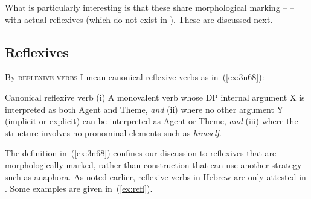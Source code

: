 \begin{exe}
\begin{xlist}
\begin{xlist}
\begin{exe}
\begin{xlist}
\begin{xlist}
\begin{exe}
\begin{xlist}
\begin{xlist}
\begin{exe}
\begin{exe}
\begin{xlist}
\begin{exe}
\begin{exe}
\begin{xlist}
\begin{exe}
\begin{exe}
\begin{exe}
\begin{exe}
\begin{exe}
\begin{xlist}
\begin{exe}
\begin{xlist}
\begin{exe}
\begin{exe}
\begin{xlist}
\begin{exe}
\begin{xlist}
\begin{exe}
\begin{xlist}
\begin{exe}
\begin{exe}
\begin{exe}
\begin{xlist}
\begin{exe}
\begin{exe}
\begin{exe}
\begin{xlist}
\begin{exe}
\begin{xlist}
\begin{exe}
\begin{exe}
\begin{xlist}
\begin{exe}
\begin{exe}
\begin{exe}
\begin{exe}
\begin{xlist}
\begin{exe}
\begin{xlist}
\begin{exe}
\begin{xlist}
\begin{exe}
\begin{xlist}
\begin{exe}
\begin{xlist}
\begin{exe}
\begin{xlist}
\begin{exe}
\begin{exe}
\begin{xlist}
\begin{exe}
\begin{xlist}
\begin{exe}
\begin{exe}
\begin{xlist}
\begin{exe}
\begin{xlist}
\begin{exe}
\begin{exe}
\begin{exe}
\begin{exe}
\begin{xlist}
\begin{xlist}
\begin{exe}
\begin{xlist}
\begin{exe}
\begin{exe}
\begin{exe}
\begin{xlist}
\begin{exe}
\begin{exe}
\begin{xlist}
What is particularly interesting is that these  share morphological marking -- \thit{} -- with actual reflexives (which do not exist in {\tnif}). These are discussed next.

	\subsection{Reflexives} \label{vz:thit:refl}
By \textsc{reflexive verbs} I mean canonical reflexive verbs as in~(\ref{ex:3n68}):

 \begin{exe}
\ex  \label{ex:3n68}Canonical reflexive verb
	(i) A monovalent verb whose DP internal argument X is interpreted as both Agent and Theme, \textit{and} (ii) where no other argument Y (implicit or explicit) can be interpreted as Agent or Theme, \textit{and} (iii) where the structure involves no pronominal elements such as \emph{himself}.
 \z 

The definition in~(\ref{ex:3n68}) confines our discussion to reflexives that are morphologically marked, rather than construction that can use another strategy such as anaphora. As noted earlier, reflexive verbs in Hebrew are only attested in \thit. Some examples are given in~(\ref{ex:refl}).


\end{exe}
\end{xlist}
\end{exe}
\end{exe}
\end{xlist}
\end{exe}
\end{exe}
\end{exe}
\end{xlist}
\end{exe}
\end{xlist}
\end{xlist}
\end{exe}
\end{exe}
\end{exe}
\end{exe}
\end{xlist}
\end{exe}
\end{xlist}
\end{exe}
\end{exe}
\end{xlist}
\end{exe}
\end{xlist}
\end{exe}
\end{exe}
\end{xlist}
\end{exe}
\end{xlist}
\end{exe}
\end{xlist}
\end{exe}
\end{xlist}
\end{exe}
\end{xlist}
\end{exe}
\end{xlist}
\end{exe}
\end{exe}
\end{exe}
\end{exe}
\end{xlist}
\end{exe}
\end{exe}
\end{xlist}
\end{exe}
\end{xlist}
\end{exe}
\end{exe}
\end{exe}
\end{xlist}
\end{exe}
\end{exe}
\end{exe}
\end{xlist}
\end{exe}
\end{xlist}
\end{exe}
\end{xlist}
\end{exe}
\end{exe}
\end{xlist}
\end{exe}
\end{xlist}
\end{exe}
\end{exe}
\end{exe}
\end{exe}
\end{exe}
\end{xlist}
\end{exe}
\end{exe}
\end{xlist}
\end{exe}
\end{exe}
\end{xlist}
\end{xlist}
\end{exe}
\end{xlist}
\end{xlist}
\end{exe}
\end{xlist}
\end{xlist}
\end{exe}
